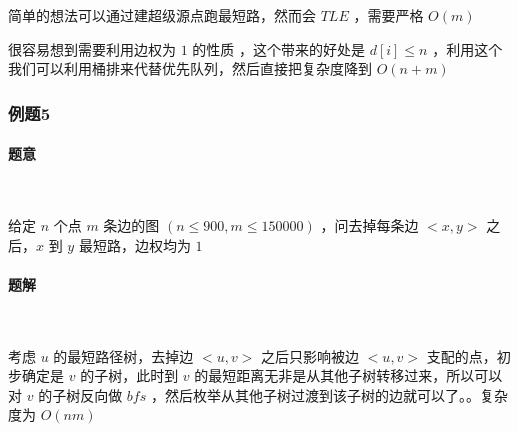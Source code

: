 	简单的想法可以通过建超级源点跑最短路，然而会 $TLE$ ，需要严格 $O(m)$
	
	很容易想到需要利用边权为 $1$ 的性质 ，这个带来的好处是 $d[i]\le n$ ，利用这个我们可以利用桶排来代替优先队列，然后直接把复杂度降到 $O(n+m)$ \\
	\subsubsection{例题5}
	\paragraph{题意}~
	
	给定 $n$ 个点 $m$ 条边的图 $(n\le900,m\le150000)$ ，问去掉每条边 $<x,y>$ 之后，$x$ 到 $y$ 最短路，边权均为 $1$
	\paragraph{题解}~
	
	考虑 $u$ 的最短路径树，去掉边 $<u,v>$ 之后只影响被边 $<u,v>$ 支配的点，初步确定是 $v$ 的子树，此时到 $v$ 的最短距离无非是从其他子树转移过来，所以可以对 $v$ 的子树反向做 $bfs$ ，然后枚举从其他子树过渡到该子树的边就可以了。。复杂度为 $O(nm)$
%